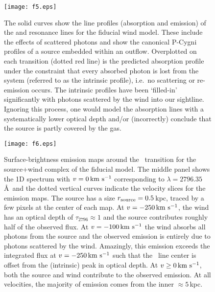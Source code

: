 \documentclass[12pt,preprint]{aastex}
\begin{document}
\begin{figure}
\texttt{[image: f5.eps]}
\caption{
The solid curves show the line profiles (absorption and emission) of
the  and  resonance lines for the fiducial wind
model.  These include the effects of scattered photons and show the
canonical P-Cygni profiles of a source 
embedded within an outflow.  Overplotted on each transition (dotted
red line) is
the predicted absorption profile under the constraint that every
absorbed photon is lost from the system (referred to as the
intrinsic profile), i.e.\ no scattering or
re-emission occurs.   The intrinsic profiles have been `filled-in' 
significantly with photons scattered by the wind into our sightline.  Ignoring this
process, one would model the absorption lines with a systematically lower
optical depth and/or (incorrectly) conclude that the source is partly covered by the
gas.  
}
\label{fig:noemiss}
\end{figure}

\begin{figure}
\texttt{[image: f6.eps]}
\caption{
Surface-brightness emission maps around the \mgiia\ transition for the
source+wind complex of the fiducial model.  The middle panel shows the
1D spectrum with $v=0 
\, {\rm km~s^{-1}}$ corresponding to $\lambda = 2796.35$\AA\ and the dotted vertical
curves indicate the velocity slices for the emission maps.  The
source has a size $r_{\rm source} = 0.5$\,kpc, traced by a few
pixels at the center of each map.   At $v=-250 \, {\rm km~s^{-1}}$, the wind has an optical
depth of $\tau_{2796} \approx 1$ and the source contributes
roughly half of the observed flux.  At $v=-100 \, {\rm km~s^{-1}}$ the
wind absorbs all photons from the source and the observed emission is
entirely due to photons scattered by the wind.  Amazingly, this
emission exceeds the integrated flux at $v = -250\, {\rm km~s^{-1}}$ such that the
\mgiia\ line center is offset from the (intrinsic) peak in optical depth.  At $v \ge 0
\, {\rm km~s^{-1}}$,  both the source and wind contribute to the observed emission.
At all velocities, the majority of emission comes from the inner
$\approx 5$\,kpc.
}
\label{fig:fiducial_ifu_mgii}
\end{figure}
\end{document}
